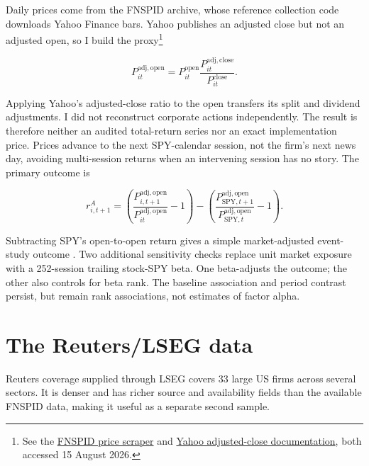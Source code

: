 Daily prices come from the FNSPID archive, whose reference collection code
downloads Yahoo Finance bars. Yahoo publishes an adjusted close but not an
adjusted open, so I build the proxy\footnote{See the \href{https://github.com/Zdong104/FNSPID_Financial_News_Dataset/blob/main/data_scraper/stock_price_scraper/get_price_from_yahoo.py}{FNSPID price scraper} and \href{https://help.yahoo.com/kb/adjusted-close-sln28256.html}{Yahoo adjusted-close documentation}, both accessed 15 August 2026.}

\begin{equation}
 P^{\mathrm{adj,open}}_{it}=P^{\mathrm{open}}_{it}
 \frac{P^{\mathrm{adj,close}}_{it}}{P^{\mathrm{close}}_{it}}.
 \label{eq:adjusted-open}
\end{equation}

Applying Yahoo's adjusted-close ratio to the open transfers its split and
dividend adjustments. I did not reconstruct corporate actions independently.
The result is therefore neither an audited total-return series nor an exact
implementation price. Prices advance to the next SPY-calendar session, not the
firm's next news day, avoiding multi-session returns when an intervening session
has no story. The primary outcome is

\begin{equation}
 r^{A}_{i,t+1}=\left(\frac{P^{\mathrm{adj,open}}_{i,t+1}}
 {P^{\mathrm{adj,open}}_{it}}-1\right)-
 \left(\frac{P^{\mathrm{adj,open}}_{\mathrm{SPY},t+1}}
 {P^{\mathrm{adj,open}}_{\mathrm{SPY},t}}-1\right).
 \label{eq:abnormal-return}
\end{equation}

Subtracting SPY's open-to-open return gives a simple market-adjusted event-study
outcome \citep{mackinlay1997}. Two additional sensitivity checks replace unit market
exposure with a 252-session trailing stock-SPY beta. One beta-adjusts the
outcome; the other also controls for beta rank. The baseline association and
period contrast persist, but remain rank associations, not estimates of factor
alpha.

\section{The Reuters/LSEG data}

Reuters coverage supplied through LSEG covers 33 large US firms across several
sectors. It is denser and has richer source and availability fields than the
available FNSPID data, making it useful as a separate second sample.

